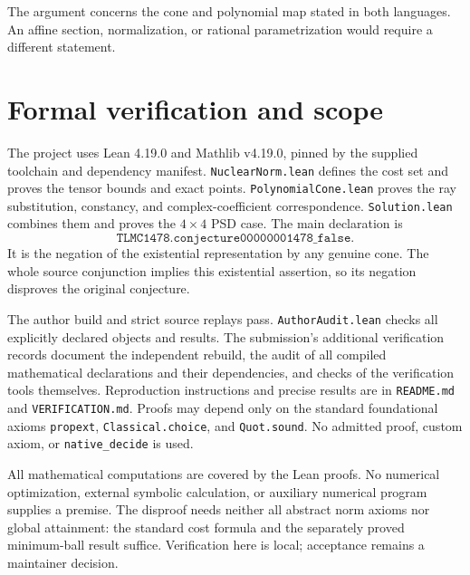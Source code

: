 \documentclass[11pt]{article}
\begin{document}
The argument concerns the cone and polynomial map stated in both
languages. An affine section, normalization, or rational parametrization
would require a different statement.

\section{Formal verification and scope}

The project uses Lean 4.19.0 and Mathlib v4.19.0, pinned by the supplied
toolchain and dependency manifest.
\texttt{NuclearNorm.lean} defines the cost set and proves the tensor bounds
and exact points. \texttt{PolynomialCone.lean} proves the ray substitution,
constancy, and complex-coefficient correspondence.
\texttt{Solution.lean} combines them and proves the \(4\times4\) PSD case.
The main declaration is
\[
 \texttt{TLMC1478.conjecture00000001478\_false}.
\]
It is the negation of the existential representation by any genuine cone.
The whole source conjunction implies this existential assertion, so its
negation disproves the original conjecture.

The author build and strict source replays pass.
\texttt{AuthorAudit.lean} checks all explicitly declared objects and
results. The submission's additional verification records document
the independent rebuild, the audit of all compiled mathematical
declarations and their dependencies, and checks of the verification
tools themselves. Reproduction instructions and precise results are
in \texttt{README.md} and \texttt{VERIFICATION.md}.
Proofs may depend only on the standard foundational axioms
\texttt{propext}, \texttt{Classical.choice}, and \texttt{Quot.sound}.
No admitted proof, custom axiom, or \texttt{native\_decide} is used.

All mathematical computations are covered by the Lean proofs.
No numerical optimization, external symbolic calculation, or auxiliary
numerical program supplies a premise. The disproof needs neither all
abstract norm axioms nor global attainment: the standard cost formula
and the separately proved minimum-ball result suffice.
Verification here is local; acceptance remains a maintainer decision.
\end{document}
